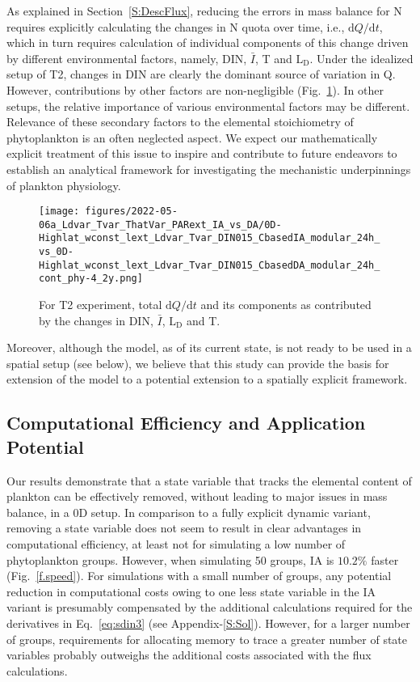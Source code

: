 \documentclass[gmd, manuscript]{copernicus}
\newcommand{\onur}[1]{\textcolor{blue}{\{Onur: #1\}}}
\begin{document}
As explained in Section~\ref{S:DescFlux}, reducing the errors in mass balance for N requires explicitly calculating the changes in N quota over time, i.e., $\textrm{d}Q/\textrm{d}t$, which in turn requires calculation of individual components of this change driven by different environmental factors, namely, DIN, $\bar{I}$, T and $\textrm{L}_{\textrm{D}}$.  Under the idealized setup of T2, changes in DIN are clearly the dominant source of variation in Q.  However, contributions by other factors are non-negligible (Fig.~\ref{f.T2dQdt}). In other setups, the relative importance of various environmental factors may be different. Relevance of these secondary factors to the elemental stoichiometry of phytoplankton is an often neglected aspect. We expect our mathematically explicit treatment of this issue to inspire and contribute to future endeavors to establish an analytical framework for investigating the mechanistic underpinnings of plankton physiology.

\begin{figure}[ht!]
\texttt{[image: figures/2022-05-06a\_Ldvar\_Tvar\_ThatVar\_PARext\_IA\_vs\_DA/0D-Highlat\_wconst\_lext\_Ldvar\_Tvar\_DIN015\_CbasedIA\_modular\_24h\_vs\_0D-Highlat\_wconst\_lext\_Ldvar\_Tvar\_DIN015\_CbasedDA\_modular\_24h\_cont\_phy-4\_2y.png]}
\caption{For T2 experiment, total $\textrm{d}Q/\textrm{d}t$ and its components as contributed by the changes in DIN, $\bar{I}$, $\textrm{L}_{\textrm{D}}$ and T.\label{f.T2dQdt}}
\end{figure}

 Moreover, although the model, as of its current state, is not ready to be used in a spatial setup (see below), we believe that this study can provide the basis for extension of the model to a potential extension to a spatially explicit framework.

\FloatBarrier
\subsection{Computational Efficiency and Application Potential}

Our results demonstrate that a state variable that tracks the elemental content of plankton can be effectively removed, without leading to major issues in mass balance, in a 0D setup. In comparison to a fully explicit dynamic variant, removing a state variable does not seem to result in clear advantages in computational efficiency, at least not for simulating a low number of phytoplankton groups.  However, when simulating 50 groups, IA is $10.2 \%$ faster (Fig.~\ref{f.speed}).
For simulations with a small number of groups, any potential reduction in computational costs owing to one less state variable in the IA variant is presumably compensated by the additional calculations required for the derivatives in Eq.~\ref{eq:sdin3} (see Appendix-\ref{S:Sol}). However, for a larger number of groups, requirements for allocating memory to trace a greater number of state variables probably outweighs the additional costs associated with the flux calculations. %
\end{document}
